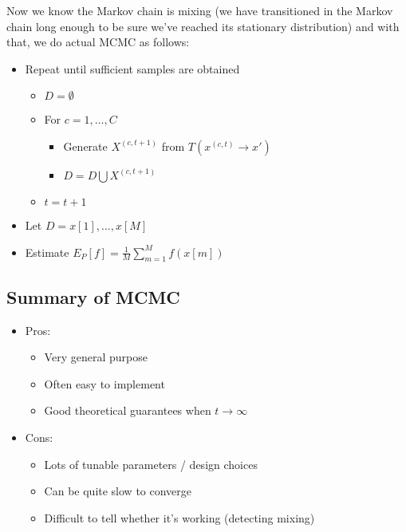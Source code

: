 \documentclass{article}
\begin{document}
    Now we know the Markov chain is mixing (we have transitioned in the Markov chain long enough to be sure we've reached its stationary distribution) and with that, we do actual MCMC as follows:

    \begin{itemize}
        \item Repeat until sufficient samples are obtained
        \begin{itemize}
            \item $D = \emptyset$
            \item For $c=1, \ldots, C$
            \begin{itemize}
                \item Generate $X^{(c, t+1)}$ from $T(x^{(c, t)} \rightarrow x')$
                \item $D = D \bigcup {X^{(c, t+1)}}$
            \end{itemize}
            \item $t = t+1$
        \end{itemize}
        \item Let $D = {x[1], \ldots, x[M]}$
        \item Estimate $E_P[f] = \frac{1}{M}\sum_{m=1}^M f(x[m])$
    \end{itemize}

\subsection{Summary of MCMC}
\begin{itemize}
    \item Pros:
    \begin{itemize}
        \item Very general purpose
        \item Often easy to implement
        \item Good theoretical guarantees when $t \rightarrow \infty$
    \end{itemize}
    \item Cons:
    \begin{itemize}
        \item Lots of tunable parameters / design choices
        \item Can be quite slow to converge
        \item Difficult to tell whether it's working (detecting mixing)
    \end{itemize}
\end{itemize}
\end{document}
